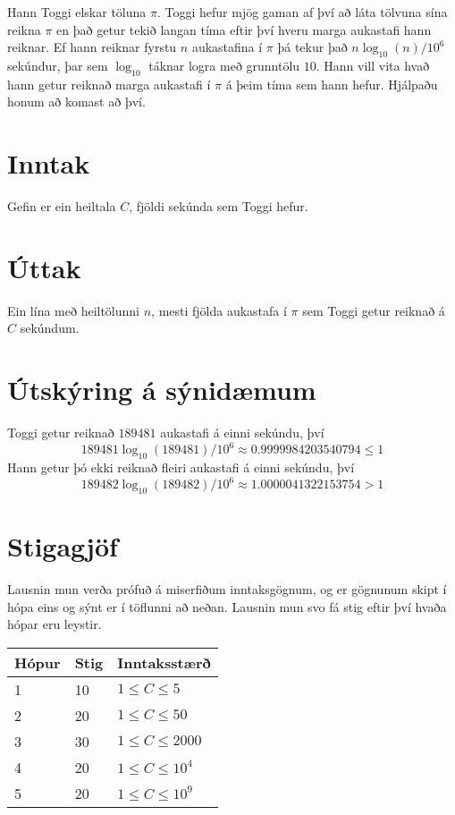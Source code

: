 
Hann Toggi elskar töluna $\pi$. Toggi hefur mjög gaman af því að láta tölvuna
sína reikna $\pi$ en það getur tekið langan tíma eftir því hveru marga
aukastafi hann reiknar. Ef hann reiknar fyrstu $n$ aukastafina í $\pi$ þá tekur
það $n \log_{10}(n) / 10^{6}$ sekúndur, þar sem $\log_{10}$ táknar logra með
grunntölu $10$. Hann vill vita hvað hann getur reiknað marga aukastafi í $\pi$
á þeim tíma sem hann hefur. Hjálpaðu honum að komast að því.

\section*{Inntak}
Gefin er ein heiltala $C$, fjöldi sekúnda sem Toggi hefur.

\section*{Úttak}
Ein lína með heiltölunni $n$, mesti fjölda aukastafa í $\pi$ sem
Toggi getur reiknað á $C$ sekúndum.

\section*{Útskýring á sýnidæmum}
Toggi getur reiknað $189481$ aukastafi á einni sekúndu, því \[ 189481 \log_{10}(189481) / 10^6 \approx 0.9999984203540794 \leq 1 \]
Hann getur þó ekki reiknað fleiri aukastafi á einni sekúndu, því \[ 189482 \log_{10}(189482) / 10^6 \approx 1.0000041322153754 > 1 \]

\section*{Stigagjöf}
Lausnin mun verða prófuð á miserfiðum inntaksgögnum, og er gögnunum skipt í
hópa eins og sýnt er í töflunni að neðan. Lausnin mun svo fá stig eftir því
hvaða hópar eru leystir.

\begin{tabular}{|l|l|l|}
\hline
Hópur & Stig & Inntaksstærð  \\ \hline
1     & 10         & $ 1 \le C \leq 5$ \\ \hline
2     & 20         & $ 1 \le C \leq 50$ \\ \hline
3     & 30         & $ 1 \le C \leq 2000$ \\ \hline
4     & 20         & $ 1 \le C \leq 10^4$ \\ \hline
5     & 20         & $ 1 \le C \leq 10^9$ \\ \hline
\end{tabular}
